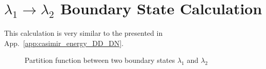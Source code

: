\documentclass{article}
\begin{document}
\section{$\lambda_1 \rightarrow \lambda_2$ Boundary State Calculation}
\label{app:lambda_12}

This calculation is very similar to the presented in App.~\ref{app:casimir_energy_DD_DN}. 

\begin{figure}[h]
\centering
{}
\caption{Partition function between two boundary states $\lambda_1$ and $\lambda_2$}
\label{fig:part-lambda1-lambda2-2}
\end{figure}
\end{document}
